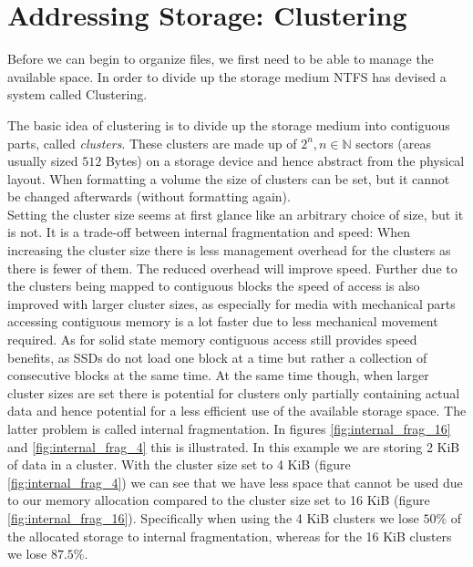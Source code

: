 \section{Addressing Storage: Clustering}
\label{sec:Cluster}
Before we can begin to organize files, we first need to be able to manage the available space. In order to divide up the storage medium NTFS has devised a system called Clustering.

The basic idea of clustering is to divide up the storage medium into contiguous parts, called \textit{clusters}. These clusters are made up of $2^n, n \in \mathbb{N}$\cite{microsoftinc:2018:DCS} sectors (areas usually sized $512$ Bytes) on a storage device and hence abstract from the physical layout. When formatting a volume the size of clusters can be set, but it cannot be changed afterwards (without formatting again).\\
Setting the cluster size seems at first glance like an arbitrary choice of size, but it is not. It is a trade-off between internal fragmentation and speed:
When increasing the cluster size there is less management overhead for the clusters as there is fewer of them. The reduced overhead will improve speed.\cite{RUSSINOVICH_ET_AL:2012:WI} Further due to the clusters being mapped to contiguous blocks the speed of access is also improved with larger cluster sizes, as especially for media with mechanical parts accessing contiguous memory is a lot faster due to less mechanical movement required. As for solid state memory contiguous access still provides speed benefits, as SSDs do not load one block at a time but rather a collection of consecutive blocks at the same time.\cite{BELLOSA:2017:OS}
At the same time though, when larger cluster sizes are set there is potential for clusters only partially containing actual data and hence potential for a less efficient use of the available storage space. The latter problem is called internal fragmentation.  
In figures \ref{fig:internal_frag_16} and \ref{fig:internal_frag_4} this is illustrated. In this example we are storing 2 KiB of data in a cluster. With the cluster size set to 4 KiB (figure \ref{fig:internal_frag_4}) we can see that we have less space that cannot be used due to our memory allocation compared to the cluster size set to 16 KiB (figure \ref{fig:internal_frag_16}). Specifically when using the 4 KiB clusters we lose $50\%$ of the allocated storage to internal fragmentation, whereas for the 16 KiB clusters we lose $87.5\%$.
